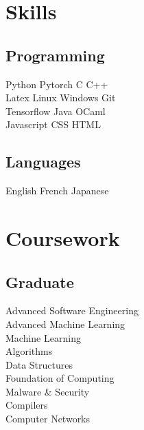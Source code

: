 \documentclass[]{deedy-resume-openfont}
\begin{document}
%
%
\lastupdated

%
%

%
%

\begin{minipage}[t]{0.33\textwidth}


\section{Skills}
\subsection{Programming}
Python \textbullet{} Pytorch \textbullet{} C \textbullet{} C++ \\
Latex \textbullet{} Linux \textbullet{} Windows \textbullet{} Git \\
Tensorflow \textbullet{} Java \textbullet{} OCaml \\
Javascript \textbullet{} CSS \textbullet{} HTML
\sectionsep

\subsection{Languages}
English \textbullet{} French \textbullet{} Japanese


\section{Coursework}
\subsection{Graduate}
Advanced Software Engineering \\
Advanced Machine Learning \\
Machine Learning \\
Algorithms \\
Data Structures \\
Foundation of Computing \\
Malware \& Security \\
Compilers \\
Computer Networks \\
\sectionsep


\end{minipage}
\end{document}
